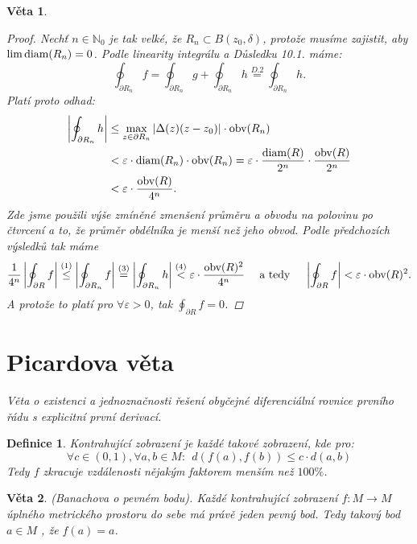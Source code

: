\documentclass[10pt,a4paper]{article}
\newcommand{\N}{{\mathbb{N}}}       %
\newcommand{\obv}{\normalfont{\text{obv}}}   	%
\newcommand{\diam}{\normalfont{\text{diam}}}   	%
\newtheorem*{thm}{Věta}
\newtheorem{Def}{Definice}[section]
\begin{document}
\begin{thm}
\begin{proof}
		Nechť $n \in \N_0$ je tak velké, že $R_n \subset B(z_0, \delta)$, protože musíme zajistit, aby $\lim \diam(R_n) = 0$.
		Podle linearity integrálu a \textit{Důsledku 10.1.} máme: \begin{equation}
				\oint_{\partial R_n}f = \oint_{\partial R_n}g + \oint_{\partial R_n}h \stackrel{D. 2}{=} \oint_{\partial R_n}h.
		\end{equation}
		Platí proto odhad: \begin{align}
				\left| \oint_{\partial R_n}h\right| &\leq \max_{z\in \partial R_n} |\Delta(z)(z-z_0)| \cdot \obv(R_n)\nonumber\\
				&< \varepsilon \cdot \diam(R_n) \cdot \obv(R_n) = \varepsilon \cdot \frac{\diam(R)}{2^n} \cdot \frac{\obv(R)}{2^n}\nonumber \\
				&< \varepsilon \cdot \frac{\obv(R)}{4^n}.
		\end{align}
		Zde jsme použili výše zmíněné \textit{zmenšení} průměru a obvodu na \textit{polovinu po čtvrcení} a to, že průměr obdélníka je \textit{menší} než jeho obvod.
		Podle předchozích výsledků tak máme \[
		\frac{1}{4^n}\left| \oint_{\partial R}f\right| \stackrel{(1)}{\leq}
		\left| \oint_{\partial R_n}f\right| \stackrel{(3)}{=}
		\left| \oint_{\partial R_n}h\right| \stackrel{(4)}{<}
		\varepsilon \cdot \frac{\obv(R)^2}{4^n}
		\quad \text{ a tedy }\quad
			\left| \oint_{\partial R}f\right|< \varepsilon \cdot \obv(R)^2.
		\]
		A protože to platí pro $\forall \varepsilon > 0$, tak $\displaystyle \oint_{\partial R}f = 0$.
	\end{proof}
\end{thm}


\section{Picardova věta}

\textit{Věta o existenci a jednoznačnosti řešení obyčejné diferenciální rovnice prvního řádu s explicitní první derivací.}
\setcounter{equation}{0}

\begin{Def} Kontrahující zobrazení \normalfont je každé takové zobrazení, kde pro: \[
	\forall c\in (0,1), \forall a,b \in M: ~~ d(f(a), f(b)) \leq c \cdot d(a,b)
	\]
	Tedy $ f $ zkracuje vzdálenosti nějakým faktorem menším než $100\%$.
\end{Def}

\begin{thm} (Banachova o pevném bodu). Každé kontrahující zobrazení $f : M \to M$ úplného metrického prostoru do sebe má právě jeden pevný bod.
	Tedy takový bod $a \in M$ , že $f(a) = a$.
\end{thm}
\end{document}
